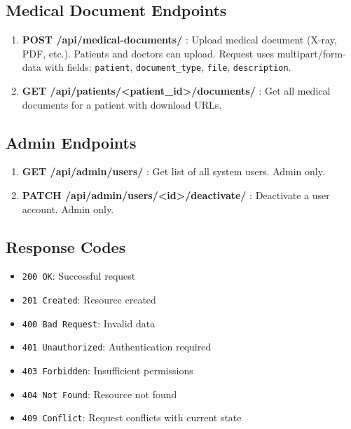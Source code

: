 \documentclass[11pt,a4paper]{article}
\begin{document}
\subsection{Medical Document Endpoints}

\begin{enumerate}
    \item \textbf{POST /api/medical-documents/} : Upload medical document (X-ray, PDF, etc.). Patients and doctors can upload. Request uses multipart/form-data with fields: \texttt{patient}, \texttt{document\_type}, \texttt{file}, \texttt{description}.
    \item \textbf{GET /api/patients/<patient\_id>/documents/} : Get all medical documents for a patient with download URLs.
\end{enumerate}

\subsection{Admin Endpoints}

\begin{enumerate}
    \item \textbf{GET /api/admin/users/} : Get list of all system users. Admin only.
    \item \textbf{PATCH /api/admin/users/<id>/deactivate/} : Deactivate a user account. Admin only.
\end{enumerate}

\subsection{Response Codes}

\begin{itemize}
    \item \texttt{200 OK}: Successful request
    \item \texttt{201 Created}: Resource created
    \item \texttt{400 Bad Request}: Invalid data
    \item \texttt{401 Unauthorized}: Authentication required
    \item \texttt{403 Forbidden}: Insufficient permissions
    \item \texttt{404 Not Found}: Resource not found
    \item \texttt{409 Conflict}: Request conflicts with current state
\end{itemize}

\end{document}
